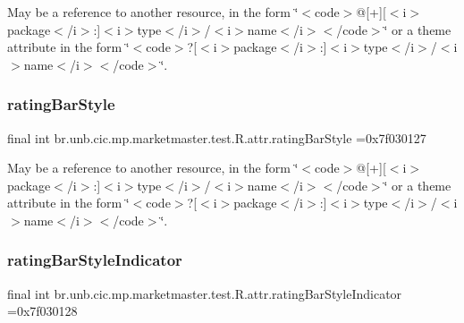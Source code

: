 May be a reference to another resource, in the form \char`\"{}$<$code$>$@\mbox{[}+\mbox{]}\mbox{[}$<$i$>$package$<$/i$>$\+:\mbox{]}$<$i$>$type$<$/i$>$/$<$i$>$name$<$/i$>$$<$/code$>$\char`\"{} or a theme attribute in the form \char`\"{}$<$code$>$?\mbox{[}$<$i$>$package$<$/i$>$\+:\mbox{]}$<$i$>$type$<$/i$>$/$<$i$>$name$<$/i$>$$<$/code$>$\char`\"{}. \mbox{\label{classbr_1_1unb_1_1cic_1_1mp_1_1marketmaster_1_1test_1_1R_1_1attr_a92a76fded489dec37980600043c7835b}} 
\subsubsection{\texorpdfstring{rating\+Bar\+Style}{ratingBarStyle}}
{\footnotesize\ttfamily final int br.\+unb.\+cic.\+mp.\+marketmaster.\+test.\+R.\+attr.\+rating\+Bar\+Style =0x7f030127\hspace{0.3cm}{\ttfamily [static]}}

May be a reference to another resource, in the form \char`\"{}$<$code$>$@\mbox{[}+\mbox{]}\mbox{[}$<$i$>$package$<$/i$>$\+:\mbox{]}$<$i$>$type$<$/i$>$/$<$i$>$name$<$/i$>$$<$/code$>$\char`\"{} or a theme attribute in the form \char`\"{}$<$code$>$?\mbox{[}$<$i$>$package$<$/i$>$\+:\mbox{]}$<$i$>$type$<$/i$>$/$<$i$>$name$<$/i$>$$<$/code$>$\char`\"{}. \mbox{\label{classbr_1_1unb_1_1cic_1_1mp_1_1marketmaster_1_1test_1_1R_1_1attr_a7b7123c7a21ddff6e1e218e2c028d337}} 
\subsubsection{\texorpdfstring{rating\+Bar\+Style\+Indicator}{ratingBarStyleIndicator}}
{\footnotesize\ttfamily final int br.\+unb.\+cic.\+mp.\+marketmaster.\+test.\+R.\+attr.\+rating\+Bar\+Style\+Indicator =0x7f030128\hspace{0.3cm}{\ttfamily [static]}}

